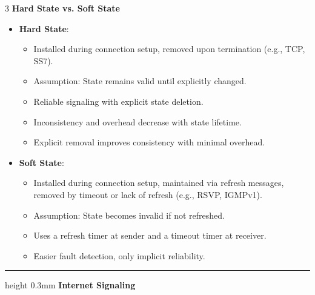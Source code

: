 \documentclass[10pt,landscape]{article}
\begin{document}
\begin{multicols}{3}
\textbf{Hard State vs. Soft State}  
\begin{itemize}
    \setlength{\itemsep}{0pt}
    \item \textbf{Hard State}:  
        \begin{itemize}
            \setlength{\itemsep}{0pt}
            \item Installed during connection setup, removed upon termination (e.g., TCP, SS7).
            \item Assumption: State remains valid until explicitly changed.
            \item Reliable signaling with explicit state deletion.
            \item Inconsistency and overhead decrease with state lifetime.
            \item Explicit removal improves consistency with minimal overhead.
        \end{itemize}
    \item \textbf{Soft State}:  
        \begin{itemize}
                \setlength{\itemsep}{0pt}
            \item Installed during connection setup, maintained via refresh messages, removed by timeout or lack of refresh (e.g., RSVP, IGMPv1).
            \item Assumption: State becomes invalid if not refreshed.
            \item Uses a refresh timer at sender and a timeout timer at receiver.
            \item Easier fault detection, only implicit reliability.
        \end{itemize}
\end{itemize}

\hrule height 0.3mm 
\vspace{0.1cm}
\textbf{Internet Signaling}  


\end{multicols}
\end{document}
